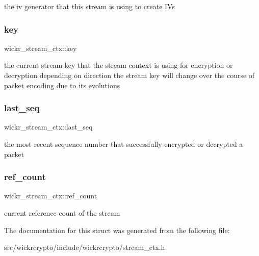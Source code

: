 the iv generator that this stream is using to create I\+Vs \mbox{\label{structwickr__stream__ctx_a3598b3c0415d13fafab6633f8c00a3c8}} 
\subsubsection{\texorpdfstring{key}{key}}
{\footnotesize\ttfamily wickr\+\_\+stream\+\_\+ctx\+::key}

the current stream key that the stream context is using for encryption or decryption depending on direction the stream key will change over the course of packet encoding due to it\textquotesingle{}s evolutions \mbox{\label{structwickr__stream__ctx_abf2c6ab54e1663e6a47e310fd68b3b3f}} 
\subsubsection{\texorpdfstring{last\+\_\+seq}{last\_seq}}
{\footnotesize\ttfamily wickr\+\_\+stream\+\_\+ctx\+::last\+\_\+seq}

the most recent sequence number that successfully encrypted or decrypted a packet \mbox{\label{structwickr__stream__ctx_aa0e74b2c117666501373a5947d92e8c4}} 
\subsubsection{\texorpdfstring{ref\+\_\+count}{ref\_count}}
{\footnotesize\ttfamily wickr\+\_\+stream\+\_\+ctx\+::ref\+\_\+count}

current reference count of the stream 

The documentation for this struct was generated from the following file\+:\begin{DoxyCompactItemize}
\item 
src/wickrcrypto/include/wickrcrypto/stream\+\_\+ctx.\+h\end{DoxyCompactItemize}
